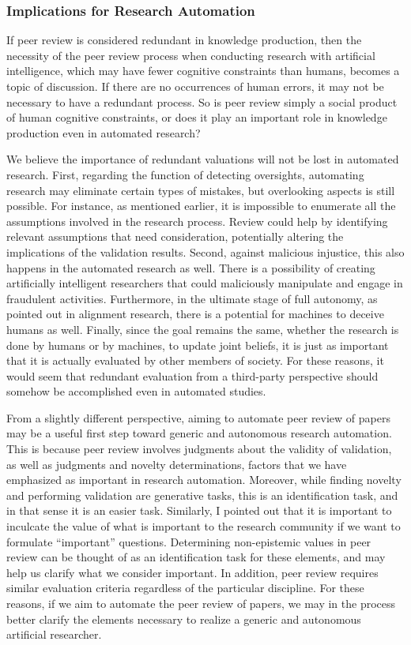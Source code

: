 \documentclass{book}
\begin{document}
\subsubsection{Implications for Research Automation}

If peer review is considered redundant in knowledge production, then the necessity of the peer review process when conducting research with artificial intelligence, which may have fewer cognitive constraints than humans, becomes a topic of discussion. If there are no occurrences of human errors, it may not be necessary to have a redundant process. So is peer review simply a social product of human cognitive constraints, or does it play an important role in knowledge production even in automated research?

We believe the importance of redundant valuations will not be lost in automated research. First, regarding the function of detecting oversights, automating research may eliminate certain types of mistakes, but overlooking aspects is still possible. For instance, as mentioned earlier, it is impossible to enumerate all the assumptions involved in the research process. Review could help by identifying relevant assumptions that need consideration, potentially altering the implications of the validation results. Second, against malicious injustice, this also happens in the automated research as well. There is a possibility of creating artificially intelligent researchers that could maliciously manipulate and engage in fraudulent activities. Furthermore, in the ultimate stage of full autonomy, as pointed out in alignment research, there is a potential for machines to deceive humans as well. Finally, since the goal remains the same, whether the research is done by humans or by machines, to update joint beliefs, it is just as important that it is actually evaluated by other members of society. For these reasons, it would seem that redundant evaluation from a third-party perspective should somehow be accomplished even in automated studies.

From a slightly different perspective, aiming to automate peer review of papers may be a useful first step toward generic and autonomous research automation. This is because peer review involves judgments about the validity of validation, as well as judgments and novelty determinations, factors that we have emphasized as important in research automation. Moreover, while finding novelty and performing validation are generative tasks, this is an identification task, and in that sense it is an easier task. Similarly, I pointed out that it is important to inculcate the value of what is important to the research community if we want to formulate ``important'' questions. Determining non-epistemic values in peer review can be thought of as an identification task for these elements, and may help us clarify what we consider important. In addition, peer review requires similar evaluation criteria regardless of the particular discipline. For these reasons, if we aim to automate the peer review of papers, we may in the process better clarify the elements necessary to realize a generic and autonomous artificial researcher.
\end{document}
